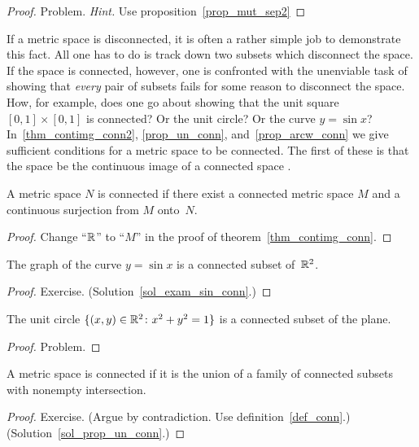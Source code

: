 \begin{proof} Problem. \emph{Hint.} Use proposition~\ref{prop_mut_sep2}  \ns   \end{proof}

If a metric space is disconnected, it is often a rather simple job to demonstrate this fact.
All one has to do is track down two subsets which disconnect the space.  If the space is
connected, however, one is confronted with the unenviable task of showing that \emph{every}
pair of subsets fails for some reason to disconnect the space.  How, for example, does one go
about showing that the unit square $[0,1] \times [0,1]$ is connected?  Or the unit circle? Or
the curve $y = \sin x$?  In~\ref{thm_contimg_conn2}, \ref{prop_un_conn},
and~\ref{prop_arcw_conn} we give sufficient conditions for a metric space to be connected.
The first of these is that the space be the continuous image of a connected space .

\begin{thm}\label{thm_contimg_conn2} A metric space $N$ is connected if there exist a connected
metric space $M$ and a continuous surjection from $M$ onto~$N$.
\end{thm}

\begin{proof} Change ``$\mathbb{R}$'' to ``$M$'' in the proof of theorem~\ref{thm_contimg_conn}.
\end{proof}

\begin{exam}\label{exam_sin_conn} The graph of the curve $y = \sin x$ is a connected subset
of~$\mathbb{R}^2$.
\end{exam}

\begin{proof} Exercise.   (Solution~\ref{sol_exam_sin_conn}.) \ns  \end{proof}

\begin{exam} The unit circle $\{(x,y) \in \mathbb{R}^2 \colon x^2 + y^2 = 1\}$ is a connected subset of
the plane.
\end{exam}

\begin{proof} Problem.  \ns   \end{proof}

\begin{prop}\label{prop_un_conn} A metric space is connected if it is the union of a family of
connected subsets with nonempty intersection.
\end{prop}

\begin{proof} Exercise.  (Argue by contradiction.  Use definition~\ref{def_conn}.)
(Solution~\ref{sol_prop_un_conn}.) \ns
\end{proof}


